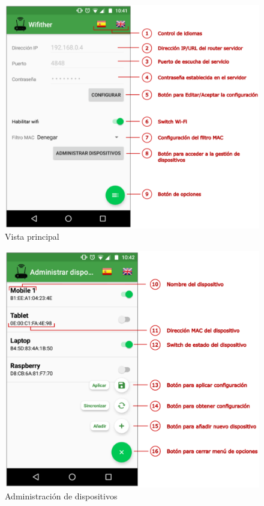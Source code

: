 \documentclass[12pt, twoside]{article}
\begin{document}
        \begin{figure}[h!]
            \centering
                \includegraphics[scale=0.5]{main_activity_manual.eps}
                \caption{Vista principal}
                \label{fig:main_activity_manual}
        \end{figure}

        \begin{figure}[h!]
            \centering
                \includegraphics[scale=0.5]{devices_activity_manual.eps}
                \caption{Administración de dispositivos}
                \label{fig:devices_activity_manual}
        \end{figure}
\end{document}
